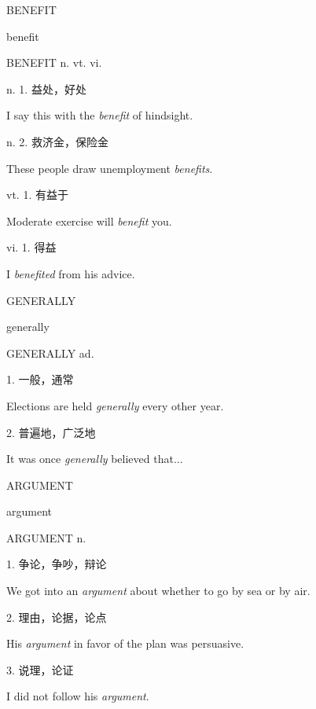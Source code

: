 \begin{flashcard}{
BENEFIT

benefit
}
\begin{center}
BENEFIT n. vt. vi. 
\end{center}
n. 1. 益处，好处

I say this with the \textit{benefit} of hindsight.

n. 2. 救济金，保险金

These people draw unemployment \textit{benefits}.

vt. 1. 有益于

Moderate exercise will \textit{benefit} you.

vi. 1. 得益

I \textit{benefited} from his advice.

\end{flashcard}
\begin{flashcard}{
GENERALLY

generally
}
\begin{center}
GENERALLY ad. 
\end{center}
1. 一般，通常

Elections are held \textit{generally} every other year.

2. 普遍地，广泛地

It was once \textit{generally} believed that...

\end{flashcard}
\begin{flashcard}{
ARGUMENT

argument
}
\begin{center}
ARGUMENT n. 
\end{center}
1. 争论，争吵，辩论

We got into an \textit{argument} about whether to go by sea or by air.

2. 理由，论据，论点

His \textit{argument} in favor of the plan was persuasive.

3. 说理，论证

I did not follow his \textit{argument}.

\end{flashcard}

